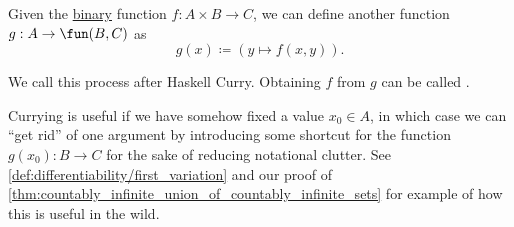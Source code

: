 \begin{definition}\label{def:function_currying}
  Given the \hyperref[con:function_arguments]{binary} function \( f: A \times B \to C \), we can define another function \( g: A \to \fun(B, C) \) as
  \begin{equation*}
    g(x) \coloneqq (y \mapsto f(x, y)).
  \end{equation*}

  We call this process  after Haskell Curry. Obtaining \( f \) from \( g \) can be called .
\end{definition}
\begin{comments}
  \item Currying is useful if we have somehow fixed a value \( x_0 \in A \), in which case we can \enquote{get rid} of one argument by introducing some shortcut for the function \( g(x_0): B \to C \) for the sake of reducing notational clutter. See \cref{def:differentiability/first_variation} and our proof of \cref{thm:countably_infinite_union_of_countably_infinite_sets} for example of how this is useful in the wild.
\end{comments}


